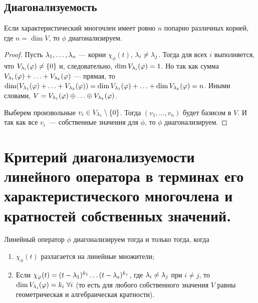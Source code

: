 \subsection*{Диагонализуемость}

\begin{Consequence}
Если характеристический многочлен имеет ровно $n$ попарно различных корней, где $n = \dim V$, то $\phi$ диагонализируем.
\end{Consequence}

\begin{proof}
Пусть $\lambda_1, \ldots, \lambda_n$ --- корни $\chi_\phi(t)$, $\lambda_i \neq \lambda_j$. Тогда для всех $i$ выполняется, что $V_{\lambda_i}(\varphi) \neq \{0\}$ и, следовательно, $\dim V_{\lambda_i}(\varphi) = 1$. Но так как сумма $V_{\lambda_1}(\varphi) + \ldots + V_{\lambda_k}(\varphi)$ --- прямая, то $\dim (V_{\lambda_1}(\varphi) + \ldots + V_{\lambda_k}(\varphi)) = \dim V_{\lambda_1}(\varphi) + \ldots + \dim V_{\lambda_k}(\varphi) = n$. Иными словами, $V = V_{\lambda_1}(\varphi) \oplus \ldots \oplus V_{\lambda_k}(\varphi)$.

Выберем произвольные $v_i \in V_{\lambda_i}\setminus\{0\}$. Тогда $(v_1, \ldots, v_n)$ будет базисом в $V$. И так как все $v_i$~--- собственные значения для $\phi$, то $\phi$ диагонализируем.
\end{proof}

\section{Критерий диагонализуемости линейного оператора в терминах его характеристического многочлена и кратностей собственных значений.}

\begin{Theorem}
Линейный оператор $\phi$ диагонализируем тогда и только тогда, когда 
\begin{enumerate}
\item $\chi_\phi(t)$ разлагается на линейные множители;
\item Если $\chi_\varphi(t) = (t - \lambda_1)^{k_1}\dots(t - \lambda_s)^{k_s}$, где $\lambda_i \neq \lambda_j$ при $i \neq j$, то $\dim V_{\lambda_i}(\varphi) = k_i \ \forall i$ (то есть для любого собственного значения $V$ равны геометрическая и алгебраическая кратности).
\end{enumerate}
\end{Theorem}

